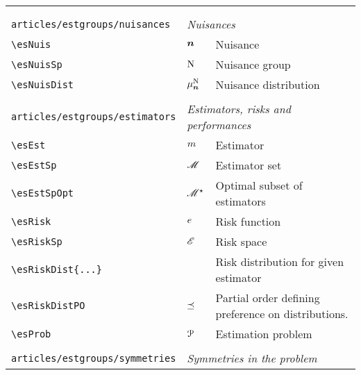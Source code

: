 \begin{longtable}{lll}
  &  & {\setlength\fboxsep{1pt}%
\fbox{%
\color[rgb]{0.5,0.5,0.5}\begin{minipage}[]{8cm}%
$\esObs = \esNuis \esObsMap(\esSt)$\par%
{\small{\texttt{\$\textbackslash esObs = \textbackslash esNuis \textbackslash esObsMap(\textbackslash esSt)\$}}}\end{minipage}%
}%
}%
\\ 
  &  & \\ 
 {\color[rgb]{0.5,0.5,0.5}\texttt{articles/estgroups/nuisances}} & \multicolumn{2}{l}{\emph{Nuisances}}\\ 
 \hline
{\color[rgb]{0.5,0.5,0.5}\texttt{\textbackslash esNuis}} & $\boldsymbol{n}$ &  Nuisance\\ 
 {\color[rgb]{0.5,0.5,0.5}\texttt{\textbackslash esNuisSp}} & $\mathrm{N}$ &  Nuisance group\\ 
 {\color[rgb]{0.5,0.5,0.5}\texttt{\textbackslash esNuisDist}} & $\mu^{\mathrm{N}}_{\boldsymbol{n}}$ &  Nuisance distribution\\ 
  &  & \\ 
 {\color[rgb]{0.5,0.5,0.5}\texttt{articles/estgroups/estimators}} & \multicolumn{2}{l}{\emph{Estimators, risks and performances}}\\ 
 \hline
{\color[rgb]{0.5,0.5,0.5}\texttt{\textbackslash esEst}} & $m$ &  Estimator\\ 
 {\color[rgb]{0.5,0.5,0.5}\texttt{\textbackslash esEstSp}} & $\mathscr{M}$ &  Estimator set\\ 
 {\color[rgb]{0.5,0.5,0.5}\texttt{\textbackslash esEstSpOpt}} & $\mathscr{M}^\star$ &  Optimal subset of estimators\\ 
 {\color[rgb]{0.5,0.5,0.5}\texttt{\textbackslash esRisk}} & $e$ &  Risk function\\ 
 {\color[rgb]{0.5,0.5,0.5}\texttt{\textbackslash esRiskSp}} & $\mathscr{E}$ &  Risk space\\ 
 {\color[rgb]{0.5,0.5,0.5}\texttt{\textbackslash esRiskDist\{...\}}} &  &  Risk distribution for given estimator\\ 
 {\color[rgb]{0.5,0.5,0.5}\texttt{\textbackslash esRiskDistPO}} & $\preceq$ &  Partial order defining preference on distributions.\\ 
 {\color[rgb]{0.5,0.5,0.5}\texttt{\textbackslash esProb}} & $\mathcal{P}$ &  Estimation problem\\ 
  &  & \\ 
 {\color[rgb]{0.5,0.5,0.5}\texttt{articles/estgroups/symmetries}} & \multicolumn{2}{l}{\emph{Symmetries in the problem}}\\ 

\end{longtable}
